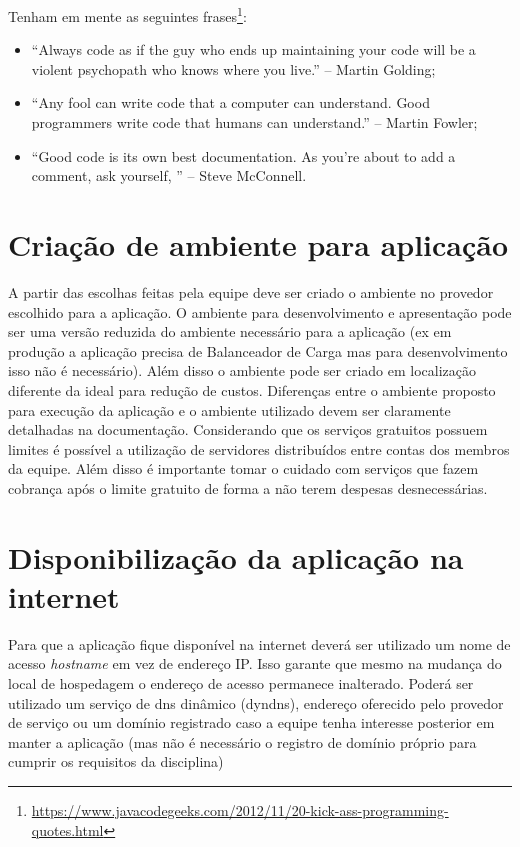 Tenham em mente as seguintes frases\footnote{\url{https://www.javacodegeeks.com/2012/11/20-kick-ass-programming-quotes.html}}:
\begin{itemize}

    \item \enquote{Always code as if the guy who ends up maintaining your code will be a violent psychopath who knows where you live.} – Martin Golding;
    
    \item \enquote{Any fool can write code that a computer can understand. Good programmers write code that humans can understand.} – Martin Fowler;
    
    \item \enquote{Good code is its own best documentation. As you’re about to add a comment, ask yourself, } – Steve McConnell.
    
\end{itemize}


\section{Criação de ambiente para aplicação}\label{atv-criacao-ambiente}
A partir das escolhas feitas pela equipe  deve ser criado o ambiente no provedor escolhido para a aplicação. O ambiente para desenvolvimento e apresentação pode ser uma versão reduzida do ambiente necessário para a aplicação (ex em produção a aplicação precisa de Balanceador de Carga mas para desenvolvimento isso não é necessário). Além disso o ambiente pode ser criado em localização diferente da ideal para redução de custos.
Diferenças entre o ambiente proposto para execução da aplicação e o ambiente utilizado devem ser claramente detalhadas na documentação.
Considerando que os serviços gratuitos possuem limites é possível a utilização de servidores distribuídos entre contas dos membros da equipe. Além disso é importante tomar o cuidado com serviços que fazem cobrança após o limite gratuito de forma a não terem despesas desnecessárias.



\section{Disponibilização da aplicação na internet}\label{atv-hostname}
Para que a aplicação fique disponível na internet deverá ser utilizado um nome de acesso \emph{hostname} em vez de endereço IP. Isso garante que mesmo na mudança do local de hospedagem o endereço de acesso permanece inalterado. Poderá ser utilizado um serviço de \ac{dns} dinâmico (dyndns), endereço oferecido pelo provedor de serviço ou um domínio registrado caso a equipe tenha interesse posterior em manter a aplicação (mas não é necessário o registro de domínio próprio para cumprir os requisitos da disciplina)



